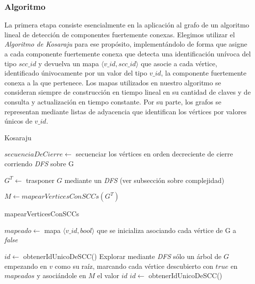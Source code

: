 \subsubsection{Algoritmo}

La primera etapa consiste esencialmente en la aplicación al grafo de un algoritmo lineal de detección de componentes fuertemente conexas. Elegimos utilizar el \textit{Algoritmo de Kosaraju} para ese propósito, implementándolo de forma que asigne a cada componente fuertemente conexa que detecta una identificación unívoca del tipo $scc\_id$ y devuelva un mapa $\langle v\_id, scc\_id \rangle$ que asocie a cada vértice, identificado únivocamente por un valor del tipo $v\_id$, la componente fuertemente conexa a la que pertenece. Los mapas utilizados en nuestro algoritmo se consideran siempre de construcción en tiempo lineal en su cantidad de claves y de consulta y actualización en tiempo constante. Por su parte, los grafos se representan mediante listas de adyacencia que identifican los vértices por valores únicos de $v\_id$.

\bigskip

\begin{algorithm}[H]
	\caption{Kosaraju}

    $\mathit{secuenciaDeCierre} \gets$ secuenciar los vértices en orden decreciente de cierre corriendo \textit{DFS} sobre G \;

    $\mathit{G^T} \gets$ trasponer $G$ mediante un \textit{DFS} (ver subsección sobre complejidad) \;

    $\mathit{M} \gets \mathit{mapearVerticesConSCCs(G^T)}$

\end{algorithm}

\bigskip

\begin{algorithm}[H]
    \caption{mapearVerticesConSCCs}

    $\mathit{mapeado} \gets$ mapa $\langle v\_id, bool \rangle$ que se inicializa asociando cada vértice de G a \textit{false}\;

    $id \gets$ obtenerIdUnicoDeSCC() \;
     {
         {
            Explorar mediante \textit{DFS} sólo un árbol de $G$ empezando en $v$ como su raíz, marcando cada vértice descubierto con $true$ en $mapeados$ y asociándole en $M$ el valor $id$ \;
            $id \gets$ obtenerIdUnicoDeSCC() \;
        }
    }

\end{algorithm}

